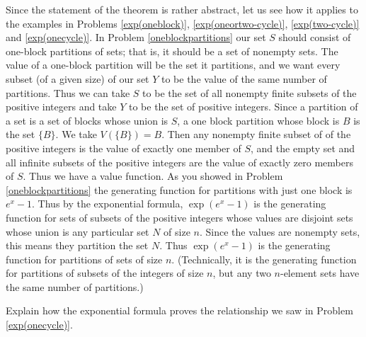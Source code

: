 Since the statement of the theorem is rather abstract, let us see how it
applies to the examples in Problems \ref{exp(oneblock)},
\ref{exp(oneortwo-cycle)}, \ref{exp(two-cycle)} and \ref{exp(onecycle)}. 
In Problem \ref{oneblockpartitions} our set $S$ should consist of
one-block partitions of sets; that is, it should be a set of nonempty
sets.  The value of a one-block partition will be the set it partitions,
and we want every subset (of a given size) of our set $Y$ to be the value
of the same number of partitions.  Thus we can take $S$ to be the set of
all nonempty finite subsets of the positive integers and take $Y$ to be
the set of positive integers.  Since a partition of a set is a set of
blocks whose union is
$S$, a one block partition whose block is $B$ is the set $\{B\}$.  We take
$V(\{B\}) =B$.  Then any nonempty finite subset of of the positive
integers is the value of exactly one member of $S$, and the empty set and
all infinite subsets of the positive integers are the value of exactly
zero members of $S$.  Thus we have a value function.  As you showed in
Problem 
\ref{oneblockpartitions} the generating function for partitions with just
one block is $e^x-1$.  Thus by the exponential formula, $\exp(e^x-1)$ is
the generating function for sets of subsets of the positive integers
whose values are disjoint sets whose union is any particular set $N$ of
size $n$.  Since the values are nonempty sets, this means they partition
the set $N$.  Thus $\exp(e^x-1)$ is the generating function for partitions
of sets of size $n$.  (Technically, it is the generating function for
partitions of subsets of the integers of size $n$, but any two
$n$-element sets have the same number of partitions.)

\bp 
\itemes Explain how the exponential formula proves the relationship we saw
in Problem \ref{exp(onecycle)}.

